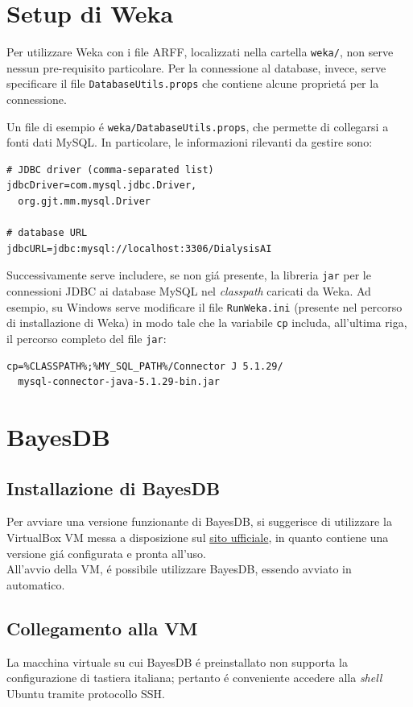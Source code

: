 \documentclass[preprint]{acm_proc_article-sp}
\begin{document}
\section{Setup di Weka}
\label{appendix-weka}
Per utilizzare Weka con i file ARFF, localizzati nella cartella \verb|weka/|, non serve nessun pre-requisito particolare. Per la connessione al database, invece, serve specificare il file \verb|DatabaseUtils.props| che contiene alcune propriet\'a per la connessione.

Un file di esempio \'e \verb|weka/DatabaseUtils.props|, che permette di collegarsi a fonti dati MySQL. In particolare, le informazioni rilevanti da gestire sono:
\begin{verbatim}
# JDBC driver (comma-separated list)
jdbcDriver=com.mysql.jdbc.Driver,
  org.gjt.mm.mysql.Driver

# database URL
jdbcURL=jdbc:mysql://localhost:3306/DialysisAI
\end{verbatim}

Successivamente serve includere, se non gi\'a presente, la libreria \verb|jar| per le connessioni JDBC ai database MySQL nel \textit{classpath} caricati da Weka.
Ad esempio, su Windows serve modificare il file \verb|RunWeka.ini| (presente nel percorso di installazione di Weka) in modo tale che la variabile \verb|cp| includa, all'ultima riga, il percorso completo del file \verb|jar|:
\begin{verbatim}
cp=%CLASSPATH%;%MY_SQL_PATH%/Connector J 5.1.29/
  mysql-connector-java-5.1.29-bin.jar
\end{verbatim}

\section{BayesDB}

\subsection{Installazione di BayesDB}
\label{appendix-bayesdb}
Per avviare una versione funzionante di BayesDB, si suggerisce di utilizzare la VirtualBox VM messa a disposizione sul \href{http://probcomp.csail.mit.edu/bayesdb/#Download}{sito ufficiale}, in quanto contiene una versione gi\'a configurata e pronta all'uso.\\
All'avvio della VM, \'e possibile utilizzare BayesDB, essendo avviato in automatico.

\subsection{Collegamento alla VM}
\label{appendix-bayesdb-collegamento}
La macchina virtuale su cui BayesDB \'e preinstallato non supporta la configurazione di tastiera italiana; pertanto \'e conveniente accedere alla \textit{shell} Ubuntu tramite protocollo SSH.
\end{document}
